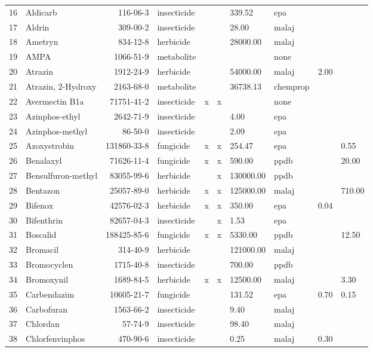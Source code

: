 \begin{longtable}{lp{3cm}rlp{0.5cm}p{0.5cm}p{1cm}p{1cm}p{1cm}p{1cm}}
  16 & Aldicarb & 116-06-3 & insecticide &  &  & 339.52 & epa &  &  \\ 
  17 & Aldrin & 309-00-2 & insecticide &  &  & 28.00 & malaj &  &  \\ 
  18 & Ametryn & 834-12-8 & herbicide &  &  & 28000.00 & malaj &  &  \\ 
  19 & AMPA & 1066-51-9 & metabolite &  &  &  & none &  &  \\ 
  20 & Atrazin & 1912-24-9 & herbicide &  &  & 54000.00 & malaj & 2.00 &  \\ 
  21 & Atrazin, 2-Hydroxy & 2163-68-0 & metabolite &  &  & 36738.13 & chemprop &  &  \\ 
  22 & Avermectin B1a & 71751-41-2 & insecticide & x & x &  & none &  &  \\ 
  23 & Azinphos-ethyl & 2642-71-9 & insecticide &  &  & 4.00 & epa &  &  \\ 
  24 & Azinphos-methyl & 86-50-0 & insecticide &  &  & 2.09 & epa &  &  \\ 
  25 & Azoxystrobin & 131860-33-8 & fungicide & x & x & 254.47 & epa &  & 0.55 \\ 
  26 & Benalaxyl & 71626-11-4 & fungicide & x & x & 590.00 & ppdb &  & 20.00 \\ 
  27 & Bensulfuron-methyl & 83055-99-6 & herbicide &  & x & 130000.00 & ppdb &  &  \\ 
  28 & Bentazon & 25057-89-0 & herbicide & x & x & 125000.00 & malaj &  & 710.00 \\ 
  29 & Bifenox & 42576-02-3 & herbicide & x & x & 350.00 & epa & 0.04 &  \\ 
  30 & Bifenthrin & 82657-04-3 & insecticide &  & x & 1.53 & epa &  &  \\ 
  31 & Boscalid & 188425-85-6 & fungicide & x & x & 5330.00 & ppdb &  & 12.50 \\ 
  32 & Bromacil & 314-40-9 & herbicide &  &  & 121000.00 & malaj &  &  \\ 
  33 & Bromocyclen & 1715-40-8 & insecticide &  &  & 700.00 & ppdb &  &  \\ 
  34 & Bromoxynil & 1689-84-5 & herbicide & x & x & 12500.00 & malaj &  & 3.30 \\ 
  35 & Carbendazim & 10605-21-7 & fungicide &  &  & 131.52 & epa & 0.70 & 0.15 \\ 
  36 & Carbofuran & 1563-66-2 & insecticide &  &  & 9.40 & malaj &  &  \\ 
  37 & Chlordan & 57-74-9 & insecticide &  &  & 98.40 & malaj &  &  \\ 
  38 & Chlorfenvinphos & 470-90-6 & insecticide &  &  & 0.25 & malaj & 0.30 &  \\ 

\end{longtable}

